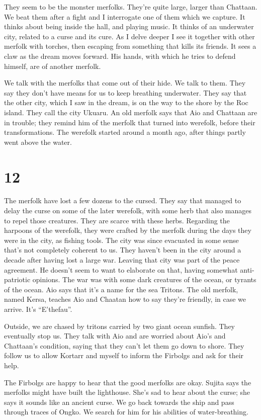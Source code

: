 \documentclass[10pt,a4paper,twoside,openany,hidelinks]{book}
\begin{document}
They seem to be the monster merfolks. They're quite large, larger than Chattaan. We beat them after a fight and I interrogate one  of them which we capture. It thinks about being inside the hall, and playing music. It thinks of an underwater city, related to a curse and its cure. As I delve deeper I see it together with other merfolk with torches, then escaping from something that kills its friends. It sees a claw as the dream moves forward. His hands, with which he tries to defend himself, are of another merfolk.

We talk with the merfolks that come out of their hide. We talk to them. They say they don't have means for us to keep breathing underwater. They say that the other city, which I saw in the dream, is on the way to the shore by the Roc island. They call the city Ukuaru. An old merfolk says that Aio and Chattaan are in trouble; they remind him of the merfolk that turned into werefolk, before their transformations. The werefolk started around a month ago, after things partly went above the water.

\chapter*{12}

The merfolk have lost a few dozens to the cursed. They say that managed to delay the curse on some of the  later werefolk, with some herb that also manages to repel those creatures.
They are scarce with these herbs.
Regarding the harpoons of the werefolk, they were crafted by the merfolk during the days they were in the city, as fishing tools.
The city was since evacuated in some sense that's not completely coherent to us. They haven't been in the city around a decade after having lost a large war. Leaving that city was part of the peace agreement. He doesn't seem to want to elaborate on that, having somewhat anti-patriotic opinions.
The war was with some dark creatures of the ocean, or tyrants of the ocean. Aio says that it's a name for the sea Tritons. The old merfolk, named Kersa, teaches Aio and Chaatan how to say they're friendly, in case we arrive. It's ``E'thefau''.

Outside, we are chased by tritons carried by two giant ocean sunfish.
They eventually stop us. They talk with Aio and are worried about Aio's and Chattaan's condition, saying that they can't let them go down to shore. They follow us to allow Kortarr and myself to inform the Firbolgs and ask for their help.

The Firbolgs are happy to hear that the good merfolks are okay. Sujita says the merfolks might have built the lighthouse. She's sad to hear about the curse; she says it sounds like an ancient curse. We go back towards the ship and pass through traces of Ongko. We search for him for his abilities of water-breathing. 
\end{document}
